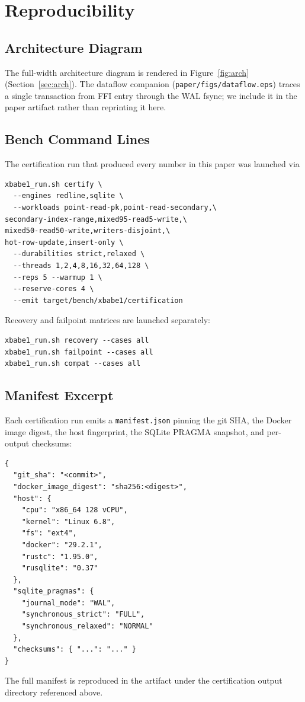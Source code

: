 \appendices
\section{Reproducibility}\label{sec:appendix}

\subsection{Architecture Diagram}
The full-width architecture diagram is rendered in
Figure~\ref{fig:arch} (Section~\ref{sec:arch}). The dataflow
companion (\texttt{paper/figs/dataflow.eps}) traces a single
transaction from FFI entry through the WAL fsync; we include it in
the paper artifact rather than reprinting it here.

\subsection{Bench Command Lines}
The certification run that produced every number in this paper was
launched via
\begin{lstlisting}[language={}]
xbabe1_run.sh certify \
  --engines redline,sqlite \
  --workloads point-read-pk,point-read-secondary,\
secondary-index-range,mixed95-read5-write,\
mixed50-read50-write,writers-disjoint,\
hot-row-update,insert-only \
  --durabilities strict,relaxed \
  --threads 1,2,4,8,16,32,64,128 \
  --reps 5 --warmup 1 \
  --reserve-cores 4 \
  --emit target/bench/xbabe1/certification
\end{lstlisting}
Recovery and failpoint matrices are launched separately:
\begin{lstlisting}[language={}]
xbabe1_run.sh recovery --cases all
xbabe1_run.sh failpoint --cases all
xbabe1_run.sh compat --cases all
\end{lstlisting}

\subsection{Manifest Excerpt}
Each certification run emits a \texttt{manifest.json} pinning the
git SHA, the Docker image digest, the host fingerprint, the SQLite
PRAGMA snapshot, and per-output checksums:
\begin{lstlisting}[language={}]
{
  "git_sha": "<commit>",
  "docker_image_digest": "sha256:<digest>",
  "host": {
    "cpu": "x86_64 128 vCPU",
    "kernel": "Linux 6.8",
    "fs": "ext4",
    "docker": "29.2.1",
    "rustc": "1.95.0",
    "rusqlite": "0.37"
  },
  "sqlite_pragmas": {
    "journal_mode": "WAL",
    "synchronous_strict": "FULL",
    "synchronous_relaxed": "NORMAL"
  },
  "checksums": { "...": "..." }
}
\end{lstlisting}
The full manifest is reproduced in the artifact under the
certification output directory referenced above.
